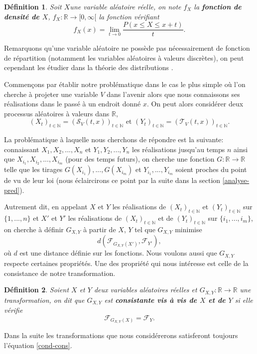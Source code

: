 \documentclass[a4paper,11pt]{article}
\numberwithin{equation}{section}
\newtheorem{definition}{Définition}
\begin{document}
\begin{definition}
	Soit $X$une variable aléatoire réelle, on note $f_{X}$ la \textbf{fonction de densité de $X$}, $f_{X}: \mathbb{R}\to [0,\infty[$ la fonction vérifiant
	\begin{equation}
		f_{X}(x)=\lim_{t\to 0} \frac{P(x\leq X \leq x+t)}{t}.
	\end{equation}
\end{definition}
Remarquons qu'une variable aléatoire ne possède pas nécessairement de fonction de répartition (notamment les variables aléatoires à valeurs discrètes), on peut cependant les étudier dans la théorie des distributions \cite{golse2020distributions}.

Commençons par établir notre problématique dans le cas le plus simple où l'on cherche à projeter une variable $V$ dans l'avenir alors que nous connaissons ses réalisations dans le passé à un endroit donné $x$.
On peut alors considérer deux processus aléatoires à valeurs dans $\mathbb{R}$, 
\[(X_t)_{t \in \mathbb{N}}=(\mathcal{S}_{V}(t, x))_{t \in \mathbb{N}} \textrm{ et } (Y_t)_{t \in \mathbb{N}}=(\mathcal{T}_{V}(t, x))_{t \in \mathbb{N}}.\]

La problématique à laquelle nous cherchons de répondre est la suivante: connaissant $X_1,X_2,...,X_n$ et $Y_1,Y_2,...,Y_n$ les réalisations jusqu'au temps $n$ ainsi que $X_{i_1},X_{i_2},...,X_{i_m}$ (pour des temps futurs), on cherche une fonction $G: \mathbb{R} \to \mathbb{R}$ telle que les tirages $G(X_{i_1}),..., G(X_{i_m})$ et $Y_{i_1},...,Y_{i_m}$ soient proches du point de vu de leur loi (nous éclaircirons ce point par la suite dans la section \ref{analyse-pred}). 

Autrement dit, en appelant $X$ et $Y$ les réalisations de $(X_t)_{t \in \mathbb{N}}$ et $(Y_t)_{t \in \mathbb{N}}$ sur $\{1,...,n\}$ et $X'$ et $Y'$ les réalisations de $(X_t)_{t \in \mathbb{N}}$ et de $(Y_t)_{t \in \mathbb{N}}$ sur $\{i_1,...,i_m\}$, on cherche à définir $G_{X,Y}$ à partir de $X$, $Y$ tel que $G_{X,Y}$ minimise 
\[d(\mathcal{F}_{G_{X,Y}(X')}, \mathcal{F}_{Y'}),\]
où $d$ est une distance définie sur les fonctions.
Nous voulons aussi que $G_{X,Y}$ respecte certaines propriétés. Une des propriété qui nous intéresse est celle de la consistance de notre transformation.

\begin{definition}
	Soient $X$ et $Y$ deux variables aléatoires réelles et $G_{X,Y}: \mathbb{R}\to \mathbb{R}$ une transformation, on dit que $G_{X,Y}$ est \textbf{consistante vis à vis de $X$ et de $Y$} si elle vérifie 
	\begin{equation}
		\label{cond-cons}
		{\mathcal{F}_{G_{X,Y}(X)}}= \mathcal{F}_{Y}.
	\end{equation}
\end{definition}
Dans la suite les transformations que nous considérerons satisferont toujours l'équation \eqref{cond-cons}.
\end{document}
